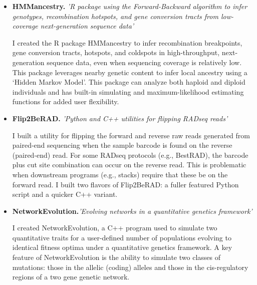 \documentclass[11pt,letterpaper,sans]{moderncv}        %
\begin{document}
\begin{itemize}

\item{\textbf{HMMancestry.} \textit{'R package using the Forward-Backward algorithm to infer genotypes, recombination hotspots, and gene conversion tracts from low-coverage next-generation sequence data'}

\vspace{4pt}

\small{I created the R package HMMancestry to infer recombination breakpoints, gene conversion tracts, hotspots, and coldspots in high-throughput, next-generation sequence data, even when sequencing coverage is relatively low. This package leverages nearby genetic content to infer local ancestry using a `Hidden Markov Model'. This package can analyze both haploid and diploid individuals and has built-in simulating and maximum-likelihood estimating functions for added user flexibility.}}


\item{\textbf{Flip2BeRAD.} \textit{'Python and C++ utilities for flipping RADseq reads'}

\vspace{4pt}

\small{I built a utility for flipping the forward and reverse raw reads generated from paired-end sequencing when the sample barcode is found on the reverse (paired-end) read. For some RADseq protocols (e.g., BestRAD), the barcode plus cut site combination can occur on the reverse read. This is problematic when downstream programs (e.g., stacks) require that these be on the forward read. I built two flavors of Flip2BeRAD: a fuller featured Python script and a quicker C++ variant.}}

\vspace{4pt}

\item{\textbf{NetworkEvolution.}\textit{'Evolving networks in a quantitative genetics framework'}

\vspace{4pt}

\small{I created NetworkEvolution, a C++ program used to simulate two quantitative traits for a user-defined number of populations evolving to identical fitness optima under a quantitative genetics framework. A key feature of NetworkEvolution is the ability to simulate two classes of mutations: those in the allelic (coding) alleles and those in the cis-regulatory regions of a two gene genetic network.}}

\end{itemize}
\end{document}
